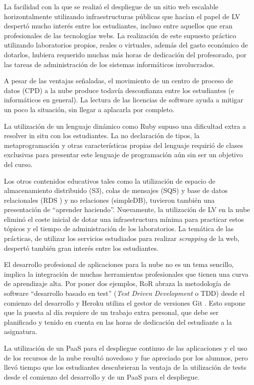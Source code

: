 \documentclass[conference]{IEEEtran}
\begin{document}
La facilidad con la que se realizó el despliegue de un sitio web escalable
horizontalmente utilizando infraestructuras públicas que hacían el papel de LV
despertó mucho interés entre los estudiantes, incluso entre aquellos que eran
profesionales de las tecnologías webs. La realización de este supuesto práctico
utilizando laboratorios propios, reales o virtuales, además del gasto
económico de dotarlos, hubiera requerido muchas más horas de
dedicación del profesorado, por las tareas de administración de los sistemas
informáticos involucrados.

A pesar de las ventajas señaladas, el movimiento de un centro de proceso de datos (CPD) 
a la nube produce todavía desconfianza entre los estudiantes (e informáticos en general).
La lectura de las licencias de software ayuda a mitigar un poco la situación, sin llegar a
aplacarla por completo.

La utilización de un lenguaje dinámico como Ruby supuso una dificultad extra a
resolver in situ con los estudiantes. La no declaración de tipos, la
metaprogramación y otras características propias del lenguaje requirió de
clases exclusivas para presentar este lenguaje de programación aún sin ser un
objetivo del curso. 

Los otros contenidos educativos tales como la utilización de espacio de
almacenamiento distribuido (S3), colas de mensajes (SQS) y  base de datos
relacionales (RDS ) y no relaciones (simpleDB), tuvieron también una presentación
de ``aprender haciendo''. Nuevamente, la utilización de LV en la nube eliminó el
coste inicial de dotar una infraestructura mínima para practicar estos tópicos
y el tiempo de administración de los  laboratorios. La temática de las
prácticas, de utilizar los servicios estudiados  para
realizar \textit{scrapping} de la web, despertó también gran interés entre los
estudiantes.

El desarrollo profesional de aplicaciones para la nube no es un tema sencillo,
implica la integración de muchas herramientas profesionales que tienen una
curva de aprendizaje alta. Por poner dos ejemplos, RoR abraza la metodología de software 
``desarrollo basado en test'' (\textit{Test Driven Development} o TDD) \cite{Rappin:2010} 
desde el comienzo del desarrollo y Heroku utiliza el gestor de versiones Git \cite{Chacon:2009}. 
Esto supone que la puesta al día requiere de un trabajo extra personal, que debe ser planificado 
y tenido en cuenta en las horas de dedicación del estudiante a la asignatura. 

La utilización de un PaaS para el despliegue continuo de las aplicaciones y el uso de los 
recursos de la nube resultó novedoso y fue apreciado por los alumnos, pero llevó tiempo 
que los estudiantes descubrieran la ventaja de la utilización de tests desde el comienzo 
del desarrollo y de un PaaS para el despliegue.
\end{document}
